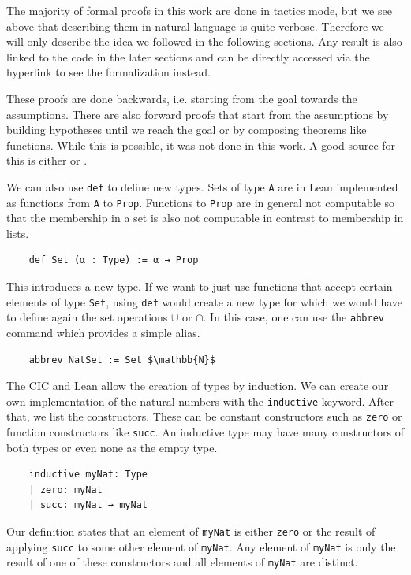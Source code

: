 The majority of formal proofs in this work are done in tactics mode, but we see above that describing them in natural language is quite verbose. Therefore we will only describe the idea we followed in the following sections. Any result is also linked to the code in the later sections and can be directly accessed via the hyperlink to see the formalization instead.

These proofs are done backwards, i.e. starting from the goal towards the assumptions. There are also forward proofs that start from the assumptions by building hypotheses until we reach the goal or by composing theorems like functions. While this is possible, it was not done in this work. A good source for this is either \cite{theoremProvingLean} or \cite{HitchhikerLogicVer}.


We can also use \lstinline|def| to define new types. Sets of type \lstinline|A| are in Lean implemented as functions from \lstinline|A| to \lstinline|Prop|. Functions to \lstinline|Prop| are in general not computable so that the membership in a set is also not computable in contrast to membership in lists.

\begin{lstlisting}
    def Set (α : Type) := α → Prop
\end{lstlisting}

This introduces a new type. If we want to just use functions that accept certain elements of type \lstinline|Set|, using \lstinline|def| would create a new type for which we would have to define again the set operations $\cup$ or $\cap$. In this case, one can use the \lstinline|abbrev| command which provides a simple alias.

\begin{lstlisting}
    abbrev NatSet := Set $\mathbb{N}$
\end{lstlisting}

The CIC and Lean allow the creation of types by induction. We can create our own implementation of the natural numbers with the \lstinline|inductive| keyword. After that, we list the constructors. These can be constant constructors such as \lstinline|zero| or function constructors like \lstinline|succ|.
An inductive type may have many constructors of both types or even none as the empty type.

\begin{lstlisting}
    inductive myNat: Type
    | zero: myNat
    | succ: myNat → myNat
\end{lstlisting}

Our definition states that an element of \lstinline|myNat| is either \lstinline|zero| or the result of applying \lstinline|succ| to some other element of \lstinline|myNat|. Any element of \lstinline|myNat| is only the result of one of these constructors and all elements of \lstinline|myNat| are distinct.


